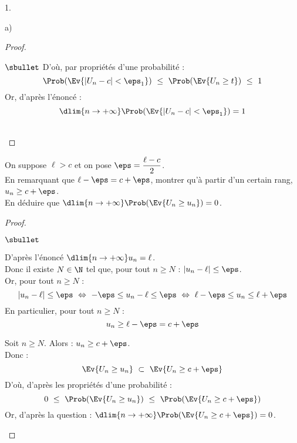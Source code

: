 \documentclass[11pt]{article}%
\begin{document}
\begin{noliste}{1.}
\begin{noliste}{a)}
\begin{proof}
\begin{noliste}{$\sbullet$}
	D'où, par propriétés d'une probabilité :
	\[
	  \Prob(\Ev{\vert U_n -c\vert < \eps_1}) \ \leq \
	  \Prob(\Ev{U_n \geq t}) \ \leq \ 1
	\]
	Or, d'après l'énoncé :
	\[
	  \dlim{n\to +\infty} \Prob(\Ev{\vert U_n - c \vert < \eps_1}) 
	  = 1
	\]
      \end{noliste}
      ~\\[-1cm]
    \end{proof}

    
    \item On suppose $\ell >c$ et on pose $\eps = 
    \dfrac{\ell-c}{2}$.\\
    En remarquant que $\ell-\eps=c+\eps$, montrer qu'à 
    partir d'un certain rang, $u_n \geq c+\eps$.\\
    En déduire que $\dlim{n \to +\infty}\Prob(\Ev{U_n \geq 
    u_n})=0$. 
    
    \begin{proof}~
      \begin{noliste}{$\sbullet$}
	\item D'après l'énoncé $\dlim{n\to+\infty}
	u_n = \ell$.\\
	Donc il existe $N\in \N$ tel que, pour tout $n\geq N$ :
	$\vert u_n - \ell \vert \leq \eps$.\\
	Or, pour tout $n \geq N$ :
	\[
	  \vert u_n - \ell \vert \leq \eps \ \Leftrightarrow \
	  -\eps \leq u_n - \ell \leq \eps \ \Leftrightarrow \
	  \ell - \eps \leq u_n \leq \ell + \eps
	\]
	En particulier, pour tout $n \geq N$ :
	\[
	  u_n \geq \ell - \eps = c+\eps
	\]
	
	\item Soit $n\geq N$. Alors : $u_n \geq c +\eps$.\\
	Donc :
	\[
	  \Ev{U_n \geq u_n} \ \subset \ \Ev{U_n \geq c+\eps}
	\]
	D'où, d'après les propriétés d'une probabilité :
	\[
	  0 \ \leq \ \Prob(\Ev{U_n \geq u_n}) \ \leq \ 
	  \Prob(\Ev{U_n \geq c+\eps})
	\]
	Or, d'après la question  : 
	$\dlim{n\to +\infty} \Prob(\Ev{U_n \geq c+\eps}) =0$.
      \end{noliste}
      

\end{proof}
\end{noliste}
\end{noliste}
\end{document}
